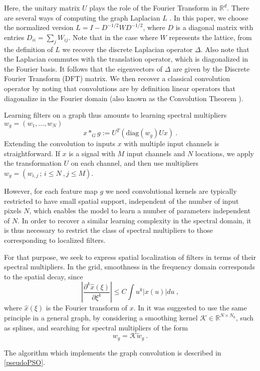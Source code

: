 \documentclass{article} %
\begin{document}
Here, the unitary matrix $U$ plays the role of the Fourier Transform in $\mathbb{R}^d$. 
There are several ways of computing the graph Laplacian $L$ \cite{belkin2001laplacian}. In this paper, we choose the normalized version $L = I - D^{-1/2}WD^{-1/2}$, where $D$ is a diagonal matrix with entries $D_{ii} = \sum_j W_{ij}$. Note that in the case where $W$ represents the lattice, from the definition of $L$ we recover the discrete Laplacian operator $\Delta$. Also note that the Laplacian commutes with the translation operator, which is diagonalized in the Fourier basis. 
It follows that the eigenvectors of $\Delta$ are given by the Discrete Fourier Transform (DFT) matrix. 
We then recover a classical convolution operator by noting that convolutions are by definition linear operators that diagonalize in the Fourier domain (also known as the Convolution Theorem \cite{mallat1999wavelet}).

Learning filters on a graph thus amounts to learning spectral multipliers $w_g = (w_1, \dots,w_N)$ 
$$x \ast_G g := U^T ( \mbox{diag}(w_g) U x)~.$$
Extending the convolution to inputs $x$ with multiple input channels is straightforward. If $x$ is a signal with $M$ input channels and $N$ locations, we apply the transformation $U$ on each channel, and then use multipliers $w_g =  (w_{i,j}\, ;\, i \leq N~, j \leq M)$. 

However, for each feature map $g$ we need convolutional kernels are typically restricted to have small spatial support, independent of the number of input pixels $N$, which enables the model to learn a number of parameters independent of $N$. In order to recover a similar learning complexity in the spectral domain, it is thus necessary to restrict the class of spectral multipliers to those corresponding to localized filters. 

For that purpose, we seek to express spatial localization of filters in terms of their spectral multipliers. In the grid, smoothness in the frequency domain corresponds to the spatial decay, since
$$\left| \frac{\partial^k \hat{x}(\xi)}{\partial \xi^k} \right| \leq C \int u^k |x(u)| du~,$$
where $\hat{x}(\xi)$ is the Fourier transform of $x$.
In \cite{spectralnet2013} it was suggested to use the same principle in a general graph, by considering a smoothing kernel $\mathcal{K} \in \mathbb{R}^{N \times N_0}$, such as splines, and searching for spectral multipliers of the form
$$w_g = \mathcal{K} \tilde{w}_g~.$$

The algorithm which implements the graph convolution is described in \ref{pseudoPSO}.
\end{document}
